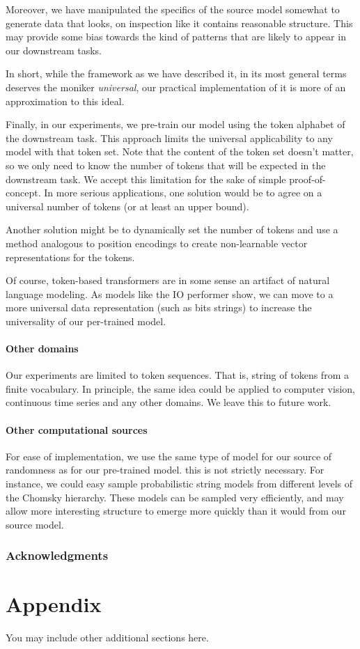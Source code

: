 \documentclass{article} %
\begin{document}
Moreover, we have manipulated the specifics of the source model somewhat to generate data that looks, on inspection like it contains reasonable structure. This may provide some bias towards the kind of patterns that are likely to appear in our downstream tasks. 

In short, while the framework as we have described it, in its most general terms deserves the moniker \emph{universal}, our practical implementation of it is more of an approximation to this ideal.

Finally, in our experiments, we pre-train our model using the token alphabet of the downstream task. This approach limits the universal applicability to any model with that token set. Note that the content of the token set doesn't matter, so we only need to know the number of tokens that will be expected in the downstream task. We accept this limitation for the sake of simple proof-of-concept. In more serious applications, one solution would be to agree on a universal number of tokens (or at least an upper bound). 

Another solution might be to dynamically set the number of tokens and use a method analogous to position encodings to create non-learnable vector representations for the tokens.

Of course, token-based transformers are in some sense an artifact of natural language modeling. As models like the IO performer show, we can move to a more universal data representation (such as bits strings) to increase the universality of our per-trained model.

\paragraph{Other domains} Our experiments are limited to token sequences. That is, string of tokens from a finite vocabulary. In principle, the same idea could be applied to computer vision, continuous time series and any other domains. We leave this to future work.

\paragraph{Other computational sources} For ease of implementation, we use the same type of model for our source of randomness as for our pre-trained model. this is not strictly necessary. For instance, we could easy sample probabilistic string models from different levels of the Chomsky hierarchy. These models can be sampled very efficiently, and may allow more interesting structure to emerge more quickly than it would from our source model.

\subsubsection*{Acknowledgments}





\appendix
\section{Appendix}
You may include other additional sections here.
\end{document}
